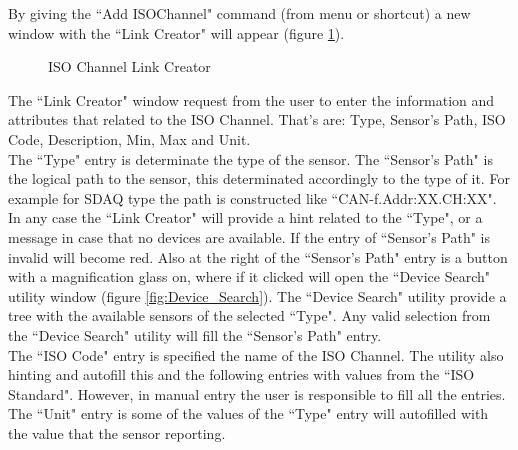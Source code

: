 By giving the ``Add ISOChannel" command (from menu or shortcut) a new window with the ``Link Creator" will appear (figure \ref{fig:ISOCH_new_link}).

\begin{figure}[h]
\centering
	\caption{ISO Channel Link Creator}
	\label{fig:ISOCH_new_link}
\end{figure}

The ``Link Creator" window request from the user to enter the information and attributes that related to the ISO Channel.
That's are: Type, Sensor's Path, ISO Code, Description, Min, Max and Unit.\\
The ``Type" entry is determinate the type of the sensor.
The ``Sensor's Path" is the logical path to the sensor, this determinated accordingly to the type of it.
For example for SDAQ type the path is constructed like ``CAN-f.Addr:XX.CH:XX".
In any case the ``Link Creator" will provide a hint related to the ``Type", or a message in case that no devices are available.
If the entry of ``Sensor's Path" is invalid will become red.
Also at the right of the ``Sensor's Path" entry is a button with a magnification glass on,
where if it clicked will open the ``Device Search" utility window (figure \ref{fig:Device_Search}).
The ``Device Search" utility provide a tree with the available sensors of the selected ``Type".
Any valid selection from the ``Device Search" utility will fill the ``Sensor's Path" entry.\\

The ``ISO Code" entry is specified the name of the ISO Channel.
The utility also hinting and autofill this and the following entries with values from the ``ISO Standard".
However, in manual entry the user is responsible to fill all the entries.\\

The ``Unit" entry is some of the values of the ``Type" entry will autofilled with the value that the sensor reporting.\\

